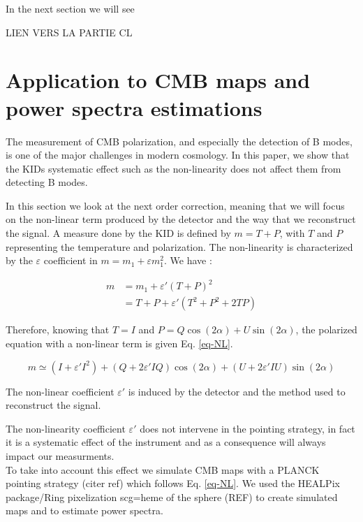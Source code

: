 In the next section we will see 

LIEN VERS LA PARTIE CL

\section{Application to CMB maps and power spectra estimations}
The measurement of CMB polarization, and especially the detection of B modes, is one of the major challenges in modern cosmology. In this paper, we show that the KIDs systematic effect such as the non-linearity does not affect them from detecting B modes.

In this section we look at the next order correction, meaning that we will focus on the non-linear term produced by the detector and the way that we reconstruct the signal. A measure done by the KID is defined by $m = T + P$, with $T$ and $P$ representing the temperature and polarization. The non-linearity is characterized  by the $\varepsilon$ coefficient in $ m = m_{1} + \varepsilon m_{1}^{2}$. We have : 

\begin{equation}
\begin{split}
m & = m_{1} +\varepsilon' (T+P)^{2} \\
 & = T + P + \varepsilon'(T^{2} + P^{2} + 2TP) 
\end{split}
\end{equation}

Therefore, knowing that $T=I$ and $P = Q\cos(2\alpha) + U \sin(2\alpha)$, the polarized equation with a non-linear term is given Eq. \ref{eq-NL}.

\begin{equation}
m  \simeq (I + \varepsilon' I^{2}) + (Q + 2\varepsilon' IQ) \cos(2\alpha) + (U + 2 \varepsilon' IU) \sin(2\alpha)
\label{eq-NL}
\end{equation}

The non-linear coefficient $\varepsilon'$ is induced by the detector and the method used to reconstruct the signal.

The non-linearity coefficient $\varepsilon'$ does not intervene in the pointing strategy, in fact it is a systematic effect of the instrument and as a consequence will always impact our measurments. \\
To take into account this effect we simulate CMB maps with a PLANCK pointing strategy (citer ref) which follows Eq. \ref{eq-NL}. We used the HEALPix package/Ring pixelization scg=heme of the sphere (REF) to create simulated maps and to estimate power spectra.

